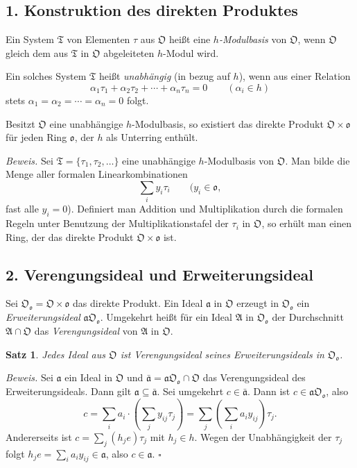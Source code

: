 \documentclass[10pt,a4paper]{article}
\theoremstyle{plain}
\newtheorem{satz}{Satz}[section]
\theoremstyle{definition}
\theoremstyle{remark}
\newcommand{\ido}{\mathfrak{o}}
\newcommand{\ida}{\mathfrak{a}}
\newcommand{\idA}{\mathfrak{A}}
\newcommand{\cO}{\mathfrak{O}}
\begin{document}
\subsection*{1. Konstruktion des direkten Produktes}

Ein System $\mathfrak{T}$ von Elementen $\tau$ aus $\cO$ hei\ss t eine \emph{$h$-Modulbasis} von $\cO$, wenn $\cO$ gleich dem aus $\mathfrak{T}$ in $\cO$ abgeleiteten $h$-Modul wird.

Ein solches System $\mathfrak{T}$ hei\ss t \emph{unabh\"angig} (in bezug auf $h$), wenn aus einer Relation
\[
\alpha_1 \tau_1 + \alpha_2 \tau_2 + \cdots + \alpha_n \tau_n = 0 \qquad (\alpha_i \in h)
\]
stets $\alpha_1 = \alpha_2 = \cdots = \alpha_n = 0$ folgt.

Besitzt $\cO$ eine unabh\"angige $h$-Modulbasis, so existiert das direkte Produkt $\cO \times \ido$ f\"ur jeden Ring $\ido$, der $h$ als Unterring enth\"ult.

\textit{Beweis.} Sei $\mathfrak{T} = \{\tau_1, \tau_2, \ldots\}$ eine unabh\"angige $h$-Modulbasis von $\cO$. Man bilde die Menge aller formalen Linearkombinationen
\[
\sum_i y_i \tau_i \qquad (y_i \in \ido,
\]
fast alle $y_i = 0$). Definiert man Addition und Multiplikation durch die formalen Regeln unter Benutzung der Multiplikationstafel der $\tau_i$ in $\cO$, so erh\"ult man einen Ring, der das direkte Produkt $\cO \times \ido$ ist.

\subsection*{2. Verengungsideal und Erweiterungsideal}

Sei $\cO_{\ido} = \cO \times \ido$ das direkte Produkt. Ein Ideal $\ida$ in $\cO$ erzeugt in $\cO_{\ido}$ ein \emph{Erweiterungsideal} $\ida \cO_{\ido}$. Umgekehrt hei\ss t f\"ur ein Ideal $\idA$ in $\cO_{\ido}$ der Durchschnitt $\idA \cap \cO$ das \emph{Verengungsideal} von $\idA$ in $\cO$.

\begin{satz}
Jedes Ideal aus $\cO$ ist Verengungsideal seines Erweiterungsideals in $\cO_{\ido}$.
\end{satz}

\textit{Beweis.} Sei $\ida$ ein Ideal in $\cO$ und $\bar{\ida} = \ida \cO_{\ido} \cap \cO$ das Verengungsideal des Erweiterungsideals. Dann gilt $\ida \subseteq \bar{\ida}$. Sei umgekehrt $c \in \bar{\ida}$. Dann ist $c \in \ida \cO_{\ido}$, also
\[
c = \sum_i a_i \cdot \left(\sum_j y_{ij} \tau_j\right) = \sum_j \left(\sum_i a_i y_{ij}\right) \tau_j.
\]
Andererseits ist $c = \sum_j (h_j e) \tau_j$ mit $h_j \in h$. Wegen der Unabh\"angigkeit der $\tau_j$ folgt $h_j e = \sum_i a_i y_{ij} \in \ida$, also $c \in \ida$. \hfill$\square$
\end{document}
